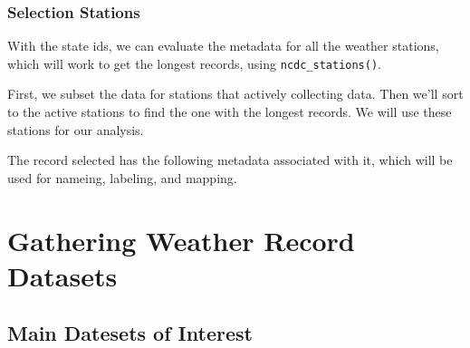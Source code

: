 \documentclass{article}
\begin{document}
\subsubsection{Selection Stations}

With the state ids, we can evaluate the metadata for all the weather stations, which will work to get the longest records, using \texttt{ncdc\_stations()}. 

First, we subset the data for stations that actively collecting data. Then we'll sort to the active stations to find the one with the longest records. We will use these stations for our analysis.

\begin{knitrout}
\color{fgcolor}\begin{kframe}


{\ttfamily\noindent\color{warningcolor}{\#\# Warning: Error: (429) - This token has reached its temporary request limit of 10000 per day.}}

{\ttfamily\noindent\bfseries\color{errorcolor}{\#\# Error in order(GSOM\_Coverage\$mindate): argument 1 is not a vector}}

{\ttfamily\noindent\bfseries\color{errorcolor}{\#\# Error in eval(expr, envir, enclos): object 'GSOM\_Sorted' not found}}\end{kframe}
\end{knitrout}

The record selected has the following metadata associated with it, which will be used for nameing, labeling, and mapping. 

\begin{kframe}


{\ttfamily\noindent\bfseries\color{errorcolor}{\#\# Error in eval(expr, envir, enclos): object 'GSOM\_Longest' not found}}

{\ttfamily\noindent\bfseries\color{errorcolor}{\#\# Error in as.Date(GSOM\_Longest\$mindate): object 'GSOM\_Longest' not found}}\end{kframe}

\section{Gathering Weather Record Datasets}

\subsection{Main Datesets of Interest}
\end{document}
